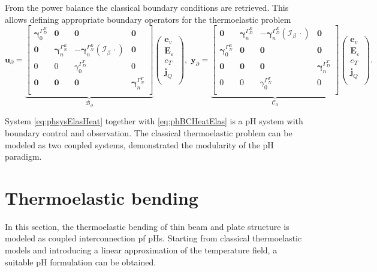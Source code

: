 From the power balance the classical boundary conditions are retrieved. This allows defining appropriate boundary operators for the thermoelastic problem
\begin{equation}\label{eq:phBCHeatElas}
	\bm{u}_\partial = 
	\underbrace{\begin{bmatrix}
	\bm{\gamma}_{0}^{\Gamma_D^E} & \bm{0} & \bm{0} & \bm{0} \\
	\bm{0} & \bm{\gamma}_n^{\Gamma_N^E} & - \bm{\gamma}_n^{\Gamma_N^E}(\mathcal{I}_\beta\, \cdot )  & \bm{0}  \\ 
	{0} & {0} & {\gamma}_{0}^{\Gamma_D^T} & {0} \\
	\bm{0} & \bm{0} & \bm{0} & \bm{\gamma}_{n}^{\Gamma_N^T} \\
	\end{bmatrix}}_{\mathcal{B}_\partial}
	\begin{pmatrix}
	\bm{e}_v \\
	\bm{E}_\varepsilon \\
	{e}_T \\
	\bm{j}_Q \\
	\end{pmatrix}, \; 
	\bm{y}_\partial = 
	\underbrace{\begin{bmatrix}
		\bm{0} & \bm{\gamma}_n^{\Gamma_D^E} & - \bm{\gamma}_n^{\Gamma_D^E}(\mathcal{I}_\beta\, \cdot )  & \bm{0}  \\ 
		\bm{\gamma}_{0}^{\Gamma_N^E} & \bm{0} & \bm{0} & \bm{0} \\
		\bm{0} & \bm{0} & \bm{0} & \bm{\gamma}_{n}^{\Gamma_D^T} \\
		{0} & {0} & {\gamma}_{0}^{\Gamma_N^T} & {0} \\
		\end{bmatrix}}_{\mathcal{C}_\partial}
	\begin{pmatrix}
	\bm{e}_v \\
	\bm{E}_\varepsilon \\
	{e}_T \\
	\bm{j}_Q \\
	\end{pmatrix}.
\end{equation} 

System \eqref{eq:phsysElasHeat} together with \eqref{eq:phBCHeatElas} is a pH system with boundary control and observation. The classical thermoelastic problem can be modeled as two coupled systems, demonstrated the modularity of the pH paradigm.


\section{Thermoelastic bending}
In this section, the thermoelastic bending of thin beam and plate structure is modeled as coupled interconnection pf pHs. Starting from classical thermoelastic models and introducing a linear approximation of the temperature field, a suitable pH formulation can be obtained.  


